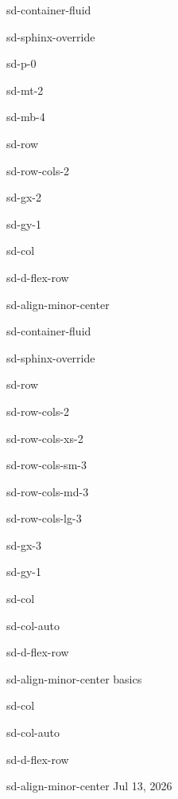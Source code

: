\documentclass[letterpaper,10pt,english]{jupyterBook}
\begin{document}
\begin{sphinxuseclass}{sd-container-fluid}
\begin{sphinxuseclass}{sd-sphinx-override}
\begin{sphinxuseclass}{sd-p-0}
\begin{sphinxuseclass}{sd-mt-2}
\begin{sphinxuseclass}{sd-mb-4}
\begin{sphinxuseclass}{sd-row}
\begin{sphinxuseclass}{sd-row-cols-2}
\begin{sphinxuseclass}{sd-gx-2}
\begin{sphinxuseclass}{sd-gy-1}
\begin{sphinxuseclass}{sd-col}
\begin{sphinxuseclass}{sd-d-flex-row}
\begin{sphinxuseclass}{sd-align-minor-center}
\begin{sphinxuseclass}{sd-container-fluid}
\begin{sphinxuseclass}{sd-sphinx-override}
\begin{sphinxuseclass}{sd-row}
\begin{sphinxuseclass}{sd-row-cols-2}
\begin{sphinxuseclass}{sd-row-cols-xs-2}
\begin{sphinxuseclass}{sd-row-cols-sm-3}
\begin{sphinxuseclass}{sd-row-cols-md-3}
\begin{sphinxuseclass}{sd-row-cols-lg-3}
\begin{sphinxuseclass}{sd-gx-3}
\begin{sphinxuseclass}{sd-gy-1}
\begin{sphinxuseclass}{sd-col}
\begin{sphinxuseclass}{sd-col-auto}
\begin{sphinxuseclass}{sd-d-flex-row}
\begin{sphinxuseclass}{sd-align-minor-center}
\sphinxAtStartPar
basics

\end{sphinxuseclass}
\end{sphinxuseclass}
\end{sphinxuseclass}
\end{sphinxuseclass}
\begin{sphinxuseclass}{sd-col}
\begin{sphinxuseclass}{sd-col-auto}
\begin{sphinxuseclass}{sd-d-flex-row}
\begin{sphinxuseclass}{sd-align-minor-center}
\sphinxAtStartPar
Jul 13, 2026


\end{sphinxuseclass}
\end{sphinxuseclass}
\end{sphinxuseclass}
\end{sphinxuseclass}
\end{sphinxuseclass}
\end{sphinxuseclass}
\end{sphinxuseclass}
\end{sphinxuseclass}
\end{sphinxuseclass}
\end{sphinxuseclass}
\end{sphinxuseclass}
\end{sphinxuseclass}
\end{sphinxuseclass}
\end{sphinxuseclass}
\end{sphinxuseclass}
\end{sphinxuseclass}
\end{sphinxuseclass}
\end{sphinxuseclass}
\end{sphinxuseclass}
\end{sphinxuseclass}
\end{sphinxuseclass}
\end{sphinxuseclass}
\end{sphinxuseclass}
\end{sphinxuseclass}
\end{sphinxuseclass}
\end{sphinxuseclass}
\end{document}

